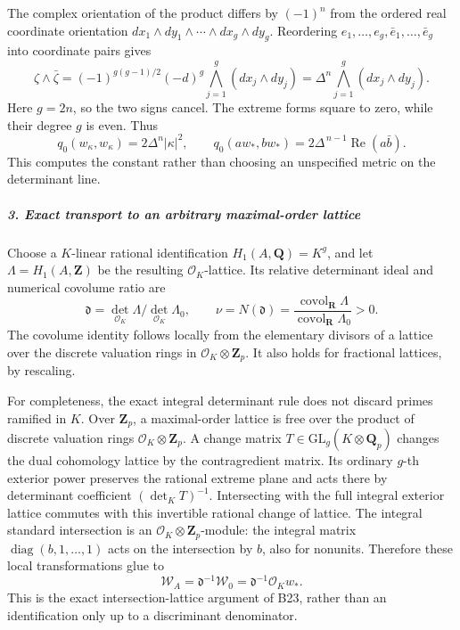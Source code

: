 \documentclass[11pt,a4paper]{article}
\theoremstyle{definition}
\begin{document}
The complex orientation of the product differs by \((-1)^n\) from the ordered real coordinate orientation \(dx_1\wedge dy_1\wedge\cdots\wedge dx_g\wedge dy_g\). Reordering \(e_1,\ldots,e_g,\bar e_1,\ldots,\bar e_g\) into coordinate pairs gives \[
 \zeta\wedge\bar\zeta
   =(-1)^{g(g-1)/2}(-d)^g
              \bigwedge_{j=1}^g(dx_j\wedge dy_j)
   =\Delta^n\bigwedge_{j=1}^g(dx_j\wedge dy_j).
 \tag{T24.12}
\] Here \(g=2n\), so the two signs cancel. The extreme forms square to zero, while their degree \(g\) is even. Thus \[
 q_0(w_\kappa,w_\kappa)=2\Delta^n|\kappa|^2,\qquad
 q_0(a w_*,b w_*)=
             2\Delta^{\,n-1}\operatorname{Re}(a\bar b).
 \tag{T24.13}
\] This computes the constant rather than choosing an unspecified metric on the determinant line.

\subparagraph{3. Exact transport to an arbitrary maximal-order lattice}\label{exact-transport-to-an-arbitrary-maximal-order-lattice}

Choose a \(K\)-linear rational identification \(H_1(A,\mathbf Q)=K^g\), and let \(\Lambda=H_1(A,\mathbf Z)\) be the resulting \(\mathcal O_K\)-lattice. Its relative determinant ideal and numerical covolume ratio are \[
 \mathfrak d
       =\det_{\mathcal O_K}\Lambda/
                         \det_{\mathcal O_K}\Lambda_0,\qquad
 \nu=N(\mathfrak d)
       =\frac{\operatorname{covol}_{\mathbf R}\Lambda}
              {\operatorname{covol}_{\mathbf R}\Lambda_0}>0.
 \tag{T24.14}
\] The covolume identity follows locally from the elementary divisors of a lattice over the discrete valuation rings in \(\mathcal O_K\otimes\mathbf Z_p\). It also holds for fractional lattices, by rescaling.

For completeness, the exact integral determinant rule does not discard primes ramified in \(K\). Over \(\mathbf Z_p\), a maximal-order lattice is free over the product of discrete valuation rings \(\mathcal O_K\otimes\mathbf Z_p\). A change matrix \(T\in\mathrm{GL}_g(K\otimes\mathbf Q_p)\) changes the dual cohomology lattice by the contragredient matrix. Its ordinary \(g\)-th exterior power preserves the rational extreme plane and acts there by determinant coefficient \((\det_KT)^{-1}\). Intersecting with the full integral exterior lattice commutes with this invertible rational change of lattice. The integral standard intersection is an \(\mathcal O_K\otimes\mathbf Z_p\)-module: the integral matrix \(\operatorname{diag}(b,1,\ldots,1)\) acts on the intersection by \(b\), also for nonunits. Therefore these local transformations glue to \[
 \mathscr W_A=\mathfrak d^{-1}\mathscr W_0
                 =\mathfrak d^{-1}\mathcal O_K w_*.
 \tag{T24.15}
\] This is the exact intersection-lattice argument of B23, rather than an identification only up to a discriminant denominator.
\end{document}
